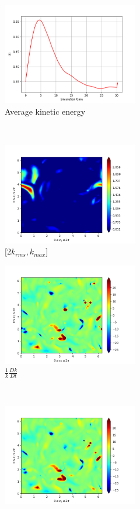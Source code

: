 \begin{figure}[H]
    \begin{subfigure}[H]{0.45\textwidth}
        \includegraphics[height=1.75in]{media/run-cds-65/ke-average1360.png}
        \caption{Average kinetic energy}
    \end{subfigure}
    ~
    \begin{subfigure}[H]{0.45\textwidth}
        \includegraphics[height=1.75in]{media/run-cds-65/ke-2-1360.png}
        \caption{$[2k_{rms}, k_{max} $] }
    \end{subfigure}
    \newline
    \begin{subfigure}[H]{0.45\textwidth}
        \includegraphics[height=1.75in]{media/run-cds-65/ke-1360.png}
        \caption{$\frac{1}{k} \frac{D k}{Dt}$}
    \end{subfigure}
    ~
    \begin{subfigure}{0.45\textwidth}
        \includegraphics[height=1.75in]{media/run-cds-65/A-ke-1360.png}

\end{subfigure}
\end{figure}
